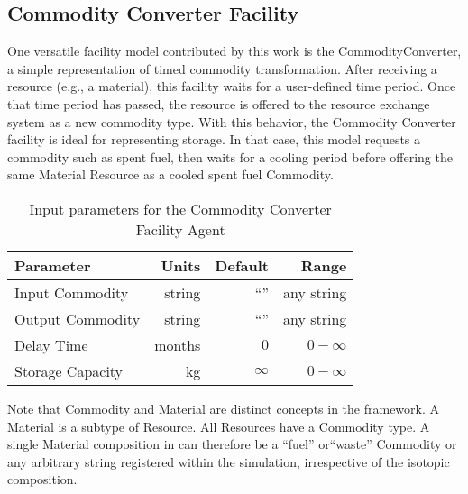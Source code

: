 \subsection{Commodity Converter Facility}

One versatile facility model contributed by this work is the 
CommodityConverter, a simple representation of timed commodity transformation. After receiving a resource
(e.g., a material), this facility waits for a user-defined time period. Once
that time period has passed, the resource is offered to the resource exchange
system as a new commodity type. With this behavior, the Commodity Converter
facility is ideal for representing storage.  In that case, this model requests a commodity 
such as spent fuel, then waits for a cooling period before offering the same 
Material Resource as a cooled spent fuel Commodity.

\begin{table}[h!]
\centering
\begin{tabular}{|l|r|r|r|}
\hline
\textbf{Parameter} & \textbf{Units} & \textbf{Default} & \textbf{Range}\\
\hline
Input Commodity& string & ``'' & any string\\
Output Commodity& string & ``'' & any string\\
Delay Time & months & $0$ & $0-\infty$\\
Storage Capacity & kg & $\infty$ &$0-\infty$ \\
\hline
\end{tabular}
\caption{Input parameters for the Commodity Converter Facility Agent}
\label{tab:commodconverter}
\end{table}


Note that Commodity and Material are distinct concepts in the \Cyclus framework.
A Material is a subtype of Resource. All Resources have a Commodity type. A
single Material composition in \Cyclus can therefore be a ``fuel'' or``waste''
Commodity or any arbitrary string registered within the simulation, 
irrespective of the isotopic composition. 

